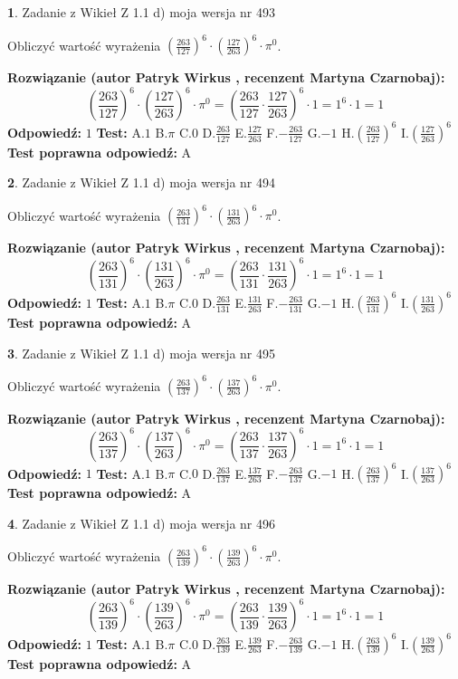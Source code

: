 \documentclass[12pt, a4paper]{article}
\theoremstyle{definition} %
\newtheorem{zad}{}
\newcommand{\zadStart}[1]{\begin{zad}#1\newline}
\newcommand{\zadStop}{\end{zad}}
\newcommand{\rozwStart}[2]{\noindent \textbf{Rozwiązanie (autor #1 , recenzent #2): }\newline}
\newcommand{\rozwStop}{\newline}
\newcommand{\odpStart}{\noindent \textbf{Odpowiedź:}\newline}
\newcommand{\odpStop}{\newline}
\newcommand{\testStart}{\noindent \textbf{Test:}\newline}
\newcommand{\testStop}{\newline}
\newcommand{\kluczStart}{\noindent \textbf{Test poprawna odpowiedź:}\newline}
\newcommand{\kluczStop}{\newline}
\begin{document}
\zadStart{Zadanie z Wikieł Z 1.1 d) moja wersja nr 493}

Obliczyć wartość wyrażenia $(\frac{263}{127})^{6} \cdot (\frac{127}{263})^{6} \cdot \pi^{0}$.
\zadStop
\rozwStart{Patryk Wirkus}{Martyna Czarnobaj}
$$(\frac{263}{127})^{6} \cdot (\frac{127}{263})^{6} \cdot \pi^{0} = (\frac{263}{127} \cdot \frac{127}{263})^{6} \cdot 1 = 1^{6} \cdot 1 = 1$$
\rozwStop
\odpStart
$1$
\odpStop
\testStart
A.$1$ B.$\pi$ C.$0$ D.$\frac{263}{127}$ E.$\frac{127}{263}$
F.$-\frac{263}{127}$ G.$-1$
H.$(\frac{263}{127})^{6}$
I.$(\frac{127}{263})^{6}$
\testStop
\kluczStart
A
\kluczStop



\zadStart{Zadanie z Wikieł Z 1.1 d) moja wersja nr 494}

Obliczyć wartość wyrażenia $(\frac{263}{131})^{6} \cdot (\frac{131}{263})^{6} \cdot \pi^{0}$.
\zadStop
\rozwStart{Patryk Wirkus}{Martyna Czarnobaj}
$$(\frac{263}{131})^{6} \cdot (\frac{131}{263})^{6} \cdot \pi^{0} = (\frac{263}{131} \cdot \frac{131}{263})^{6} \cdot 1 = 1^{6} \cdot 1 = 1$$
\rozwStop
\odpStart
$1$
\odpStop
\testStart
A.$1$ B.$\pi$ C.$0$ D.$\frac{263}{131}$ E.$\frac{131}{263}$
F.$-\frac{263}{131}$ G.$-1$
H.$(\frac{263}{131})^{6}$
I.$(\frac{131}{263})^{6}$
\testStop
\kluczStart
A
\kluczStop



\zadStart{Zadanie z Wikieł Z 1.1 d) moja wersja nr 495}

Obliczyć wartość wyrażenia $(\frac{263}{137})^{6} \cdot (\frac{137}{263})^{6} \cdot \pi^{0}$.
\zadStop
\rozwStart{Patryk Wirkus}{Martyna Czarnobaj}
$$(\frac{263}{137})^{6} \cdot (\frac{137}{263})^{6} \cdot \pi^{0} = (\frac{263}{137} \cdot \frac{137}{263})^{6} \cdot 1 = 1^{6} \cdot 1 = 1$$
\rozwStop
\odpStart
$1$
\odpStop
\testStart
A.$1$ B.$\pi$ C.$0$ D.$\frac{263}{137}$ E.$\frac{137}{263}$
F.$-\frac{263}{137}$ G.$-1$
H.$(\frac{263}{137})^{6}$
I.$(\frac{137}{263})^{6}$
\testStop
\kluczStart
A
\kluczStop



\zadStart{Zadanie z Wikieł Z 1.1 d) moja wersja nr 496}

Obliczyć wartość wyrażenia $(\frac{263}{139})^{6} \cdot (\frac{139}{263})^{6} \cdot \pi^{0}$.
\zadStop
\rozwStart{Patryk Wirkus}{Martyna Czarnobaj}
$$(\frac{263}{139})^{6} \cdot (\frac{139}{263})^{6} \cdot \pi^{0} = (\frac{263}{139} \cdot \frac{139}{263})^{6} \cdot 1 = 1^{6} \cdot 1 = 1$$
\rozwStop
\odpStart
$1$
\odpStop
\testStart
A.$1$ B.$\pi$ C.$0$ D.$\frac{263}{139}$ E.$\frac{139}{263}$
F.$-\frac{263}{139}$ G.$-1$
H.$(\frac{263}{139})^{6}$
I.$(\frac{139}{263})^{6}$
\testStop
\kluczStart
A
\kluczStop
\end{document}
